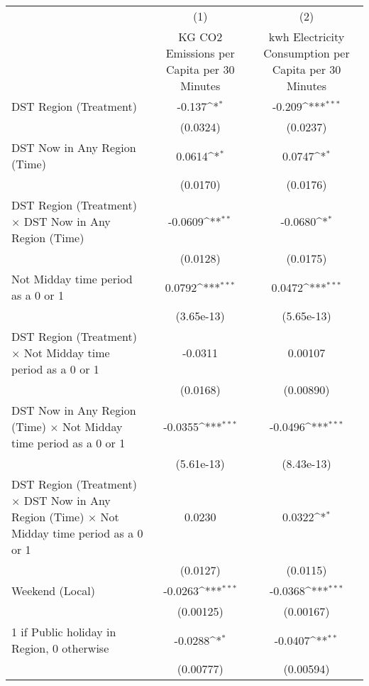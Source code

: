 {
\def\sym#1{\ifmmode^{#1}\else\(^{#1}\)\fi}
\begin{tabular}{l*{2}{c}}
\hline\hline
                    &\multicolumn{1}{c}{(1)}&\multicolumn{1}{c}{(2)}\\
                    &\multicolumn{1}{c}{KG CO2 Emissions per Capita per 30 Minutes}&\multicolumn{1}{c}{kwh Electricity Consumption per Capita per 30 Minutes}\\
\hline
DST Region (Treatment)&      -0.137\sym{*}  &      -0.209\sym{***}\\
                    &    (0.0324)         &    (0.0237)         \\
[1em]
DST Now in Any Region (Time)&      0.0614\sym{*}  &      0.0747\sym{*}  \\
                    &    (0.0170)         &    (0.0176)         \\
[1em]
DST Region (Treatment) $\times$ DST Now in Any Region (Time)&     -0.0609\sym{**} &     -0.0680\sym{*}  \\
                    &    (0.0128)         &    (0.0175)         \\
[1em]
Not Midday time period as a 0 or 1&      0.0792\sym{***}&      0.0472\sym{***}\\
                    &  (3.65e-13)         &  (5.65e-13)         \\
[1em]
DST Region (Treatment) $\times$ Not Midday time period as a 0 or 1&     -0.0311         &     0.00107         \\
                    &    (0.0168)         &   (0.00890)         \\
[1em]
DST Now in Any Region (Time) $\times$ Not Midday time period as a 0 or 1&     -0.0355\sym{***}&     -0.0496\sym{***}\\
                    &  (5.61e-13)         &  (8.43e-13)         \\
[1em]
DST Region (Treatment) $\times$ DST Now in Any Region (Time) $\times$ Not Midday time period as a 0 or 1&      0.0230         &      0.0322\sym{*}  \\
                    &    (0.0127)         &    (0.0115)         \\
[1em]
Weekend (Local)     &     -0.0263\sym{***}&     -0.0368\sym{***}\\
                    &   (0.00125)         &   (0.00167)         \\
[1em]
1 if Public holiday in Region, 0 otherwise&     -0.0288\sym{*}  &     -0.0407\sym{**} \\
                    &   (0.00777)         &   (0.00594)         \\

\end{tabular}}
